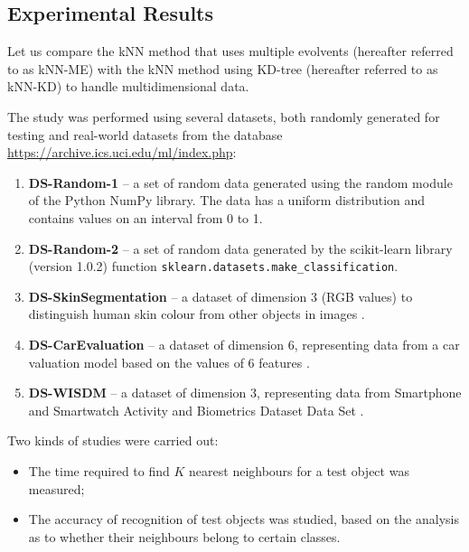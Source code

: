 \documentclass[entropy,article,submit,moreauthors,pdftex]{Definitions/mdpi}
\begin{document}
\begin{paracol}{2}
\section{Experimental Results}\label{results}

Let us compare the kNN method that uses multiple evolvents (hereafter referred to as kNN-ME) with the kNN method using KD-tree (hereafter referred to as kNN-KD) \cite{Hou2018} to handle multidimensional data.

The study was performed using several datasets, both randomly generated for testing and real-world  datasets from the database \url{https://archive.ics.uci.edu/ml/index.php}:
\begin{enumerate}
\item
\textbf{DS-Random-1} -- a set of random data generated using the random module of the Python NumPy library. The data has a uniform distribution and contains values on an interval from 0 to 1.

\item
\textbf{DS-Random-2} -- a set of random data generated by the scikit-learn library (version 1.0.2) function \texttt{sklearn.datasets.make\_classification}.

\item
\textbf{DS-SkinSegmentation} -- a dataset of dimension 3 (RGB values) to distinguish human skin colour from other objects in images \cite{ds-1}.

\item
\textbf{DS-CarEvaluation} -- a dataset of dimension 6, representing data from a car valuation model based on the values of 6 features \cite{ds-2}.

\item
\textcolor[rgb]{1,0,0}{\textbf{DS-WISDM} -- a dataset of dimension 3, representing data from Smartphone and Smartwatch Activity and Biometrics Dataset Data Set \cite{ds-3}.}

\end{enumerate}

Two kinds of studies were carried out:
\begin{itemize}
\item The time required to find $K$ nearest neighbours for a test object was measured;
\item The accuracy of recognition of test objects was studied, based on the analysis as to whether their neighbours belong to certain classes.
\end{itemize}


\end{paracol}
\end{document}
